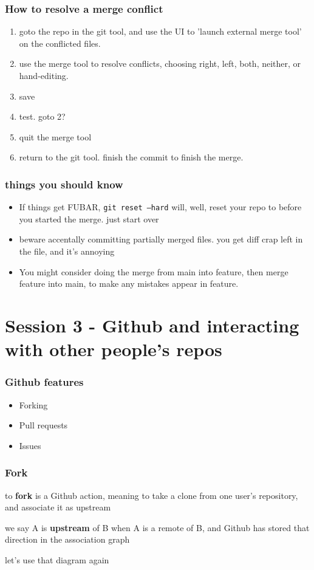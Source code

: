 \documentclass[14pt,aspectratio=1610]{beamer} %
\newcommand{\fframe}[2]{
   \begin{frame}
\frametitle{#1}
#2
\end{frame}
}
\begin{document}
\fframe{How to resolve a merge conflict}
{

		\begin{enumerate}
			\item goto the repo in the git tool, and use the UI to 'launch external merge tool' on the conflicted files.
			\item use the merge tool to resolve conflicts, choosing right, left, both, neither, or hand-editing.
			\item save
			\item test.  goto 2?
			\item quit the merge tool
			\item return to the git tool.  finish the commit to finish the merge.
		\end{enumerate}

}



\fframe{things you should know}
{
\begin{itemize}
		\item If things get FUBAR, {\tt git reset --hard} will, well, reset your repo to before you started the merge.  just start over
		\item beware accentally committing partially merged files.  you get diff crap left in the file, and it's annoying
		\item You might consider doing the merge from main into feature, then merge feature into main, to make any mistakes appear in feature.
	\end{itemize}
}










\section{Session 3 - Github and interacting with other people's repos}

\fframe{Github features}
{
\begin{itemize}
	\item Forking
	\item Pull requests
	\item Issues
\end{itemize}
}


\fframe{Fork}
{
	\begin{definition}
to {\bf fork} is a Github action, meaning to take a clone from one user's repository, and associate it as upstream
	\end{definition}

	\begin{definition}
we say A is {\bf upstream} of B when A is a remote of B, and Github has stored that direction in the association graph
	\end{definition}

	let's use that diagram again
}
\end{document}
